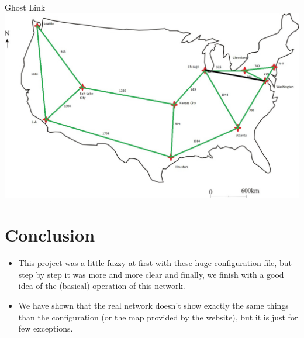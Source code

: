 \documentclass[usenames,dvipsnames]{beamer}
\begin{document}
\begin{frame}{Ghost Link}
\includegraphics[width=\textwidth]{map_ghost_link.jpg}
\end{frame}


\section*{Conclusion}
\begin{frame}{\insertsection}
\begin{itemize}
	\item This project was a little fuzzy at first with these huge configuration file, but step by step it was more and more clear and finally, we finish with a good idea of the (basical) operation of this network.
	\item We have shown that the real network doesn't show exactly the same things than the configuration (or the map provided by the website), but it is just for few exceptions.
    
 \end{itemize}

\end{frame}
\end{document}
